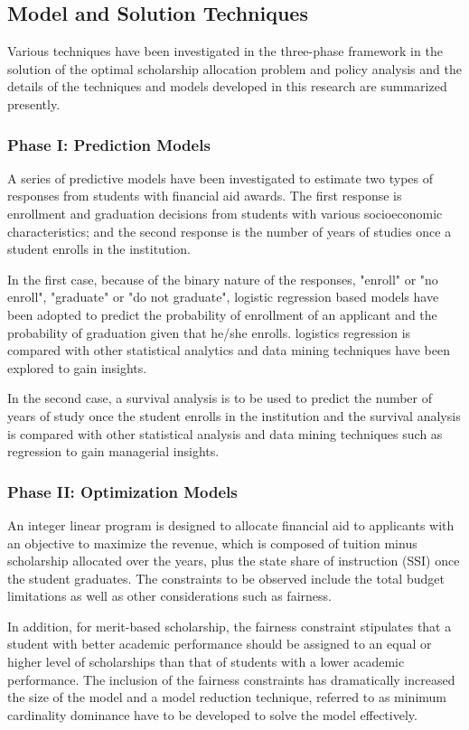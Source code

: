 \documentclass[12pt,english]{report}
\begin{document}
\subsection{Model and Solution Techniques}
Various techniques have been investigated in the three-phase framework in the
solution of the optimal scholarship allocation problem and policy analysis and
the details of the techniques and models developed in this research are
summarized presently.

\subsubsection{Phase I: Prediction Models}
A series of predictive models have been investigated to estimate two types of
responses from students with financial aid awards. The first response is
enrollment and graduation decisions from students with various socioeconomic
characteristics;  and the second response is the number of years of studies
once a student enrolls in the institution.

In the first case,  because of the binary nature of the responses,  "enroll" or
"no enroll",  "graduate" or "do not graduate", logistic regression based models
have been adopted to predict the probability of enrollment of an applicant and
the probability of graduation given that he/she enrolls.   logistics regression
is compared with other statistical analytics and data mining techniques have
been explored to gain insights.

In the second case, a survival analysis is to be used to predict the number of
years of study once the student enrolls in the institution and the survival
analysis is compared with other statistical analysis and data mining
techniques such as regression to gain managerial insights.

\subsubsection{Phase II: Optimization Models}
An integer linear program is designed to allocate financial aid to applicants
with an objective to maximize the revenue, which is composed of tuition minus
scholarship allocated over the years, plus the state share of instruction (SSI)
once the student graduates.  The constraints to be observed include the total
budget limitations as well as other considerations such as fairness.

In addition, for merit-based scholarship, the fairness constraint stipulates
that a student with better academic performance should be assigned to an equal
or higher level of scholarships than that of students with a lower academic
performance. The inclusion of the fairness constraints has dramatically
increased the size of the model and a model reduction technique, referred to as
minimum cardinality dominance have to be developed to solve the model
effectively.
\end{document}
